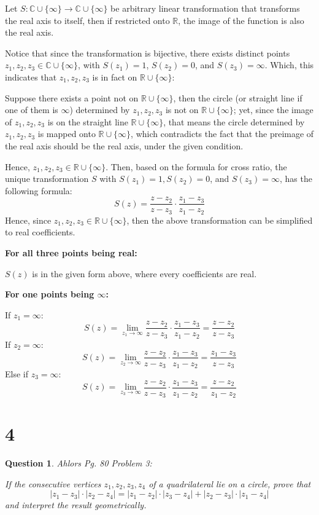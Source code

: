 \documentclass{article}
\newtheorem{question}{Question}
\begin{document}
Let $S:\mathbb{C}\cup\{\infty\}\rightarrow \mathbb{C}\cup\{\infty\}$ be arbitrary linear transformation that transforms the real axis to itself, then if restricted onto $\mathbb{R}$, 
the image of the function is also the real axis. 

Notice that since the transformation is bijective,
there exists distinct points $z_1,z_2,z_3\in\mathbb{C}\cup\{\infty\}$, with $S(z_1)=1$, $S(z_2)=0$, and $S(z_3)=\infty$.
Which, this indicates that $z_1,z_2,z_3$ is in fact on $\mathbb{R}\cup\{\infty\}$:

Suppose there exists a point not on $\mathbb{R}\cup\{\infty\}$, then the circle (or straight line if one of them is $\infty$) determined by $z_1,z_2,z_3$ is not on $\mathbb{R}\cup\{\infty\}$;
yet, since the image of $z_1,z_2,z_3$ is on the straight line $\mathbb{R}\cup\{\infty\}$,
that means the circle determined by $z_1,z_2,z_3$ is mapped onto $\mathbb{R}\cup\{\infty\}$, which contradicts the fact that the preimage
of the real axis should be the real axis, under the given condition.

\hfill

Hence, $z_1,z_2,z_3\in \mathbb{R}\cup\{\infty\}$. Then, based on the formula for cross ratio,
the unique transformation $S$ with $S(z_1)=1, S(z_2)=0$, and $S(z_3)=\infty$, has the following formula:
$$S(z)=\frac{z-z_2}{z-z_3}\cdot\frac{z_1-z_3}{z_1-z_2}$$
Hence, since $z_1,z_2,z_3\in \mathbb{R}\cup\{\infty\}$, then the above transformation can be simplified to real coefficients.

\hfill

\textbf{For all three points being real:}

$S(z)$ is in the given form above, where every coefficients are real.

\hfill

\textbf{For one points being $\infty$:}

If $z_1=\infty$:
$$S(z)=\lim_{z_1\rightarrow\infty}\frac{z-z_2}{z-z_3}\cdot\frac{z_1-z_3}{z_1-z_2}=\frac{z-z_2}{z-z_3}$$
If $z_2=\infty$:
$$S(z)=\lim_{z_2\rightarrow\infty}\frac{z-z_2}{z-z_3}\cdot\frac{z_1-z_3}{z_1-z_2}=\frac{z_1-z_3}{z-z_3}$$
Else if $z_3=\infty$:
$$S(z)=\lim_{z_3\rightarrow\infty}\frac{z-z_2}{z-z_3}\cdot\frac{z_1-z_3}{z_1-z_2}=\frac{z-z_2}{z_1-z_2}$$



\break

\section*{4}
\begin{myBox}[]{}
    \begin{question}
        Ahlors Pg. 80 Problem 3:

        If the consecutive vertices $z_1,z_2,z_3,z_4$ of a quadrilateral lie on a circle, prove that
        $$|z_1-z_3|\cdot|z_2-z_4|=|z_1-z_2|\cdot|z_3-z_4|+|z_2-z_3|\cdot|z_1-z_4|$$
        and interpret the result geometrically.
    \end{question}
\end{myBox}
\end{document}
